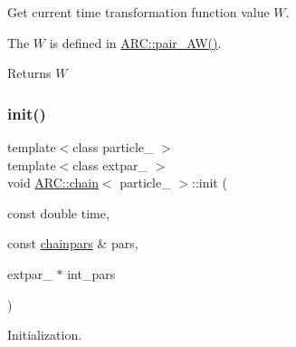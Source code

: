 Get current time transformation function value $W$. 

The $W$ is defined in \hyperlink{namespaceARC_afc1f57a75859038cbd2492366fd1849c}{A\+R\+C\+::pair\+\_\+\+A\+W()}. \begin{DoxyReturn}{Returns}
$W$ 
\end{DoxyReturn}
\hypertarget{classARC_1_1chain_a9ddc18539223abcb6451805abc15aea9}{}\label{classARC_1_1chain_a9ddc18539223abcb6451805abc15aea9} 
\subsubsection{\texorpdfstring{init()}{init()}}
{\footnotesize\ttfamily template$<$class particle\+\_\+ $>$ \\
template$<$class extpar\+\_\+ $>$ \\
void \hyperlink{classARC_1_1chain}{A\+R\+C\+::chain}$<$ particle\+\_\+ $>$\+::init (\begin{DoxyParamCaption}\item[{const double}]{time,  }\item[{const \hyperlink{classARC_1_1chainpars}{chainpars} \&}]{pars,  }\item[{extpar\+\_\+ $\ast$}]{int\+\_\+pars }\end{DoxyParamCaption})\hspace{0.3cm}{\ttfamily [inline]}}



Initialization. 

